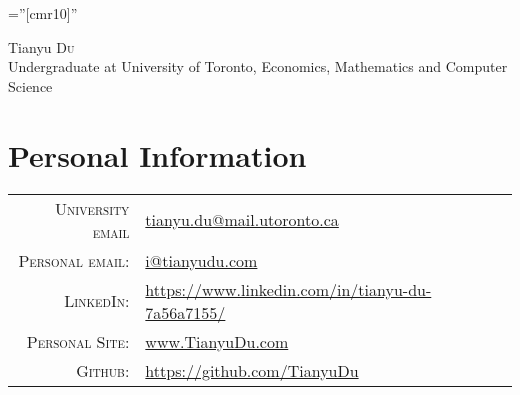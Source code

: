 \documentclass[a4paper,10pt]{article}
\begin{document}

\pagestyle{empty} %

\font\fb=''[cmr10]'' %

\par{\centering
		{\Huge Tianyu \textsc{Du} \\
		\small Undergraduate at University of Toronto, Economics, Mathematics and Computer Science
	}\bigskip\par}

\section{Personal Information}

\begin{tabular}{rl}
    \textsc{University email} & \href{mailto:tianyu.du@mail.utoronto.ca}{tianyu.du@mail.utoronto.ca} \\
    \textsc{Personal email:} & \href{mailto:i@tianyudu.com}{i@tianyudu.com} \\
    \textsc{LinkedIn:} & \href{https://www.linkedin.com/in/tianyu-du-7a56a7155/}{https://www.linkedin.com/in/tianyu-du-7a56a7155/} \\
    \textsc{Personal Site:} & \href{www.tianyudu.com}{www.TianyuDu.com} \\
    \textsc{Github:} & \href{https://github.com/TianyuDu}{https://github.com/TianyuDu}
\end{tabular}
\end{document}
